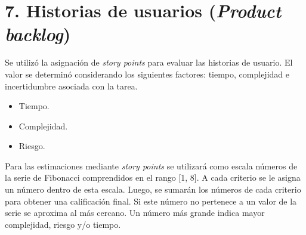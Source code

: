 \documentclass[
11pt, %
]{charter}
\begin{document}
\section{7. Historias de usuarios (\textit{Product backlog})}
\label{sec:backlog}

Se utilizó la asignación de \textit{story points} para evaluar las historias de usuario. El valor se determinó considerando los siguientes factores: tiempo, complejidad e incertidumbre asociada con la tarea. 

\begin{itemize}
	\item Tiempo.
	\item Complejidad.
	\item Riesgo.
\end{itemize}

Para las estimaciones mediante  \textit{story points} se utilizará como escala números de la serie de Fibonacci comprendidos en el rango [1, 8]. A cada criterio se le asigna un número dentro de esta escala. Luego, se sumarán los números de cada criterio para obtener una calificación final. Si este número no pertenece a un valor de la serie se aproxima al más cercano. Un número más grande indica mayor complejidad, riesgo y/o tiempo.
\end{document}
